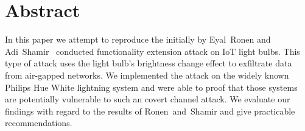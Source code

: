 \section*{Abstract}

In this paper we attempt to reproduce the initially by Eyal~Ronen and Adi~Shamir~\cite{Ronen:2016:EFAIDCSL} conducted functionality extension attack on IoT light bulbs. This type of attack uses the light bulb's brightness change effect to exfiltrate data from air-gapped networks. We implemented the attack on the widely known Philips Hue White lightning system and were able to proof that those systems are potentially vulnerable to such an covert channel attack. We evaluate our findings with regard to the results of Ronen~and~Shamir and give practicable recommendations. 
